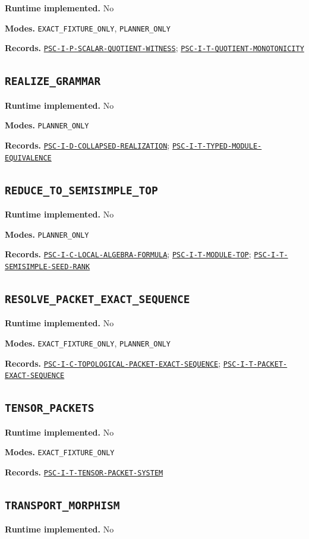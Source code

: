 \documentclass[a4paper,11pt]{article}
\newcommand{\field}[2]{\par\smallskip\noindent\textbf{#1.} #2\par}
\begin{document}
\field{Runtime implemented}{No}
\field{Modes}{\nolinkurl{EXACT_FIXTURE_ONLY}, \nolinkurl{PLANNER_ONLY}}
\field{Records}{\hyperref[rec:PSC-I-P-SCALAR-QUOTIENT-WITNESS]{\nolinkurl{PSC-I-P-SCALAR-QUOTIENT-WITNESS}}; \hyperref[rec:PSC-I-T-QUOTIENT-MONOTONICITY]{\nolinkurl{PSC-I-T-QUOTIENT-MONOTONICITY}}}
\subsection*{\nolinkurl{REALIZE_GRAMMAR}}
\field{Runtime implemented}{No}
\field{Modes}{\nolinkurl{PLANNER_ONLY}}
\field{Records}{\hyperref[rec:PSC-I-D-COLLAPSED-REALIZATION]{\nolinkurl{PSC-I-D-COLLAPSED-REALIZATION}}; \hyperref[rec:PSC-I-T-TYPED-MODULE-EQUIVALENCE]{\nolinkurl{PSC-I-T-TYPED-MODULE-EQUIVALENCE}}}
\subsection*{\nolinkurl{REDUCE_TO_SEMISIMPLE_TOP}}
\field{Runtime implemented}{No}
\field{Modes}{\nolinkurl{PLANNER_ONLY}}
\field{Records}{\hyperref[rec:PSC-I-C-LOCAL-ALGEBRA-FORMULA]{\nolinkurl{PSC-I-C-LOCAL-ALGEBRA-FORMULA}}; \hyperref[rec:PSC-I-T-MODULE-TOP]{\nolinkurl{PSC-I-T-MODULE-TOP}}; \hyperref[rec:PSC-I-T-SEMISIMPLE-SEED-RANK]{\nolinkurl{PSC-I-T-SEMISIMPLE-SEED-RANK}}}
\subsection*{\nolinkurl{RESOLVE_PACKET_EXACT_SEQUENCE}}
\field{Runtime implemented}{No}
\field{Modes}{\nolinkurl{EXACT_FIXTURE_ONLY}, \nolinkurl{PLANNER_ONLY}}
\field{Records}{\hyperref[rec:PSC-I-C-TOPOLOGICAL-PACKET-EXACT-SEQUENCE]{\nolinkurl{PSC-I-C-TOPOLOGICAL-PACKET-EXACT-SEQUENCE}}; \hyperref[rec:PSC-I-T-PACKET-EXACT-SEQUENCE]{\nolinkurl{PSC-I-T-PACKET-EXACT-SEQUENCE}}}
\subsection*{\nolinkurl{TENSOR_PACKETS}}
\field{Runtime implemented}{No}
\field{Modes}{\nolinkurl{EXACT_FIXTURE_ONLY}}
\field{Records}{\hyperref[rec:PSC-I-T-TENSOR-PACKET-SYSTEM]{\nolinkurl{PSC-I-T-TENSOR-PACKET-SYSTEM}}}
\subsection*{\nolinkurl{TRANSPORT_MORPHISM}}
\field{Runtime implemented}{No}
\end{document}
